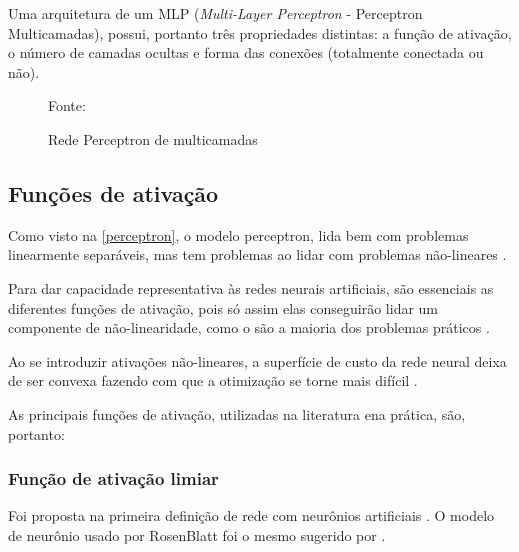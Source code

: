 Uma arquitetura de um MLP (\textit{Multi-Layer Perceptron} - Perceptron Multicamadas), possui, portanto três propriedades distintas: a função de ativação, o número de camadas ocultas e forma das conexões (totalmente conectada ou não).

\begin{figure}[h!]
	\centering
	\caption{Rede Perceptron de multicamadas}

	{\scriptsize 	Fonte: }
	\label{fig:pmc}
\end{figure}

\subsection{Funções de ativação}\label{funcoes_ativacao}
Como visto na \autoref{perceptron}, o modelo perceptron, lida bem com problemas linearmente separáveis, mas tem problemas ao lidar com problemas  não-lineares \cite{haykin_redes_2001}. 

Para dar capacidade representativa às redes neurais artificiais, são essenciais as diferentes funções de ativação, pois só assim elas conseguirão lidar um componente de não-linearidade, como o são a maioria dos problemas práticos \cite{hagan_neural_1996}.

Ao se introduzir ativações não-lineares, a superfície de custo da rede neural deixa de ser convexa fazendo com que a otimização se torne mais difícil \cite{minsky_perceptrons:_1969, haykin_redes_2001}.

As principais funções de ativação, utilizadas na literatura ena prática, são, portanto:

\subsubsection{Função de ativação limiar}\label{ativacao:limiar}
Foi proposta na primeira definição de rede com neurônios artificiais \cite{rosenblatt_perceptron:_1958}. O modelo de neurônio usado por RosenBlatt foi o mesmo sugerido por . 

